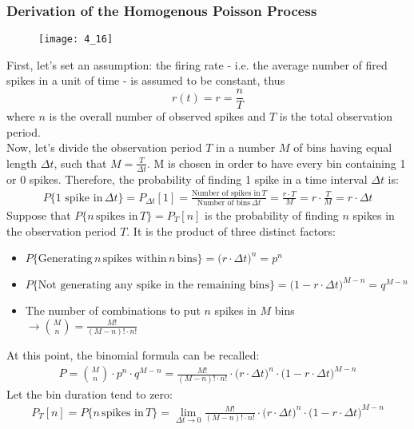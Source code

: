 \subsubsection{Derivation of the Homogenous Poisson Process}
\begin{figure}[H]
    \texttt{[image: 4\_16]}
    \centering
\end{figure}
First, let's set an assumption: the firing rate - i.e. the average number
of fired spikes in a unit of time - is assumed to be constant, thus
\begin{equation*}
    r(t)=r=\frac{n}{T}
\end{equation*}
where \(n\) is the overall number of observed spikes
and \(T\) is the total observation period.\\
Now, let's divide the observation period \(T\) in a number \(M\) of bins having
equal length \(\Delta t\), such that \(M=\frac{T}{\Delta{t}}\). M is chosen in order to have every bin containing 1 or 0 spikes. Therefore,
the probability of finding 1 spike in a time interval \(\Delta{t}\) is:
\begin{align*}
    P\{\text{1 spike in}\,\Delta{t}\}=P_{\Delta{t}}[1]
    =\frac{\text{Number of spikes in}\,T}{\text{Number of bins}\,\Delta{t}}
    =\frac{r\cdot{T}}{M}
    =r\cdot\frac{T}{M}
    =r\cdot{\Delta{t}}
\end{align*}
Suppose that \(P\{n\,\text{spikes in}\,T\}=P_T[n]\) is the probability of finding \(n\)
spikes in the observation period \(T\). It is the product of three distinct factors:
\begin{itemize}
    \item \(P\{\text{Generating}\,n\,\text{spikes within}\,n\,\text{bins}\}
          =\bigl(r\cdot{\Delta{t}}\bigr)^n=p^n\)
    \item \(P\{\text{Not generating any spike in the remaining bins}\}
          =\bigl(1-r\cdot{\Delta{t}}\bigr)^{M-n}=q^{M-n}\)
    \item The number of combinations to put \(n\) spikes in \(M\) bins
          \(\rightarrow\binom{M}{n}=\frac{M!}{(M-n)!\cdot{n!}}\)
\end{itemize}
At this point, the binomial formula can be recalled:
\begin{align*}
    P=\binom{M}{n}\cdot{p^n}\cdot{q^{M-n}}=\frac{M!}{(M-n)!\cdot{n!}}\cdot{\bigl(r\cdot{\Delta{t}}\bigr)^n}\cdot{\bigl(1-r\cdot{\Delta{t}}\bigr)^{M-n}}
\end{align*}
Let the bin duration tend to zero:
\begin{align*}
    P_T[n]=P\{n\,\text{spikes in}\,T\} =\lim_{\Delta{t}\to{0}}\frac{M!}{(M-n)!\cdot{n!}}\cdot{\bigl(r\cdot{\Delta{t}}\bigr)^n}\cdot{\bigl(1-r\cdot{\Delta{t}}\bigr)^{M-n}}
\end{align*}
